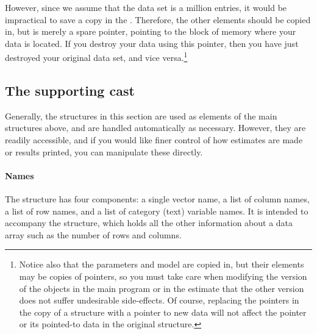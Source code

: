 However, since we assume that the data set is a million entries, it
would be impractical to save a copy in the .
Therefore, the other elements should be copied in, but
 is merely a spare
pointer, pointing to the block of memory where your data is located. If
you destroy your data using this pointer, then you have just destroyed
your original data set, and vice versa.\footnote{Notice also that the
parameters and model are copied in, but their elements may be copies of pointers, so
you must take care when modifying the version of the objects in the main
program or in the estimate that the other version does not suffer
undesirable side-effects. Of course, replacing the pointers in the copy
of a structure with a pointer to new data will not affect the pointer or
its pointed-to data in
the original structure.}



\subsection{\treesymbol{} The supporting cast}
Generally, the structures in this section are used as elements of the main
structures above, and are handled automatically as necessary. However,
they are readily accessible, and if you would like finer control of how
estimates are made or results printed, you can manipulate these
directly.

\paragraph{Names}
The  structure has four components: a single vector
name, a list of column
names, a list of row names, and a list of category (text) variable
names. It is intended to accompany the  structure,
which holds all the other information about a data array such as the
number of rows and columns. 

